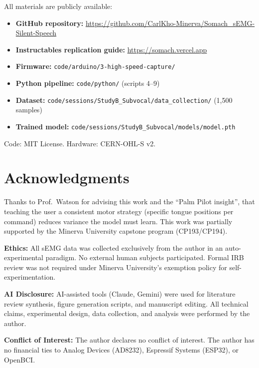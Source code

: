\documentclass{article}
\begin{document}
All materials are publicly available:
\begin{itemize}
    \item \textbf{GitHub repository:} \url{https://github.com/CarlKho-Minerva/Somach_sEMG-Silent-Speech}
    \item \textbf{Instructables replication guide:} \url{https://somach.vercel.app}
    \item \textbf{Firmware:} \texttt{code/arduino/3-high-speed-capture/}
    \item \textbf{Python pipeline:} \texttt{code/python/} (scripts 4--9)
    \item \textbf{Dataset:} \texttt{code/sessions/StudyB\_Subvocal/data\_collection/} (1{,}500 samples)
    \item \textbf{Trained model:} \texttt{code/sessions/StudyB\_Subvocal/models/model.pth}
\end{itemize}
Code: MIT License. Hardware: CERN-OHL-S v2.

\section*{Acknowledgments}

Thanks to Prof.\ Watson for advising this work and the ``Palm Pilot insight'', that teaching the user a consistent motor strategy (specific tongue positions per command) reduces variance the model must learn. This work was partially supported by the Minerva University capstone program (CP193/CP194).

\textbf{Ethics:} All sEMG data was collected exclusively from the author in an auto-experimental paradigm. No external human subjects participated. Formal IRB review was not required under Minerva University's exemption policy for self-experimentation.

\textbf{AI Disclosure:} AI-assisted tools (Claude, Gemini) were used for literature review synthesis, figure generation scripts, and manuscript editing. All technical claims, experimental design, data collection, and analysis were performed by the author.

\textbf{Conflict of Interest:} The author declares no conflict of interest. The author has no financial ties to Analog Devices (AD8232), Espressif Systems (ESP32), or OpenBCI.
\end{document}
